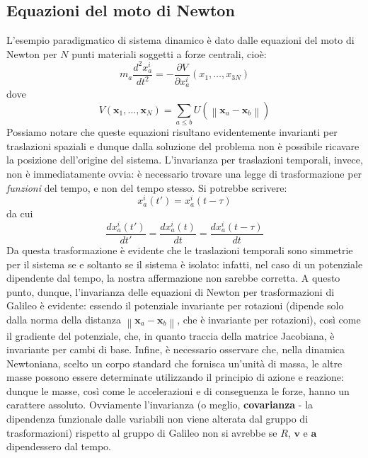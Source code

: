 \documentclass[a4paper,11pt]{book}
\theoremstyle{plain}
\theoremstyle{definition}
\begin{document}
\subsection{Equazioni del moto di Newton}
L'esempio paradigmatico di sistema dinamico è dato dalle equazioni del moto di Newton per $N$ punti materiali soggetti a forze centrali, cioè:
\[
m_a \frac{d^2x_a^i}{dt^2}=-\frac{\partial V}{\partial x_a^i}(x_1,\ldots,x_{3N})
\]
dove 
\[
V(\textbf{x}_1,\ldots,\textbf{x}_N)=\sum_{a\leq b} U(\left\| \textbf{x}_a-\textbf{x}_b \right\|)
\]
Possiamo notare che queste equazioni risultano evidentemente invarianti per traslazioni spaziali e dunque dalla soluzione del problema non è possibile ricavare la posizione dell'origine del sistema. L'invarianza per traslazioni temporali, invece, non è immediatamente ovvia: è necessario trovare una legge di trasformazione per \emph{funzioni} del tempo, e non del tempo stesso. Si potrebbe scrivere:
\[
x_a^i(t')=x_a^i(t-\tau)
\]
da cui
\[
\frac{dx_a^i(t')}{dt'}=\frac{dx_a^i(t)}{dt}=\frac{dx_a^i(t-\tau)}{dt}
\]
Da questa trasformazione è evidente che le traslazioni temporali sono simmetrie per il sistema se e soltanto se il sistema è isolato: infatti, nel caso di un potenziale dipendente dal tempo, la nostra affermazione non sarebbe corretta. A questo punto, dunque, l'invarianza delle equazioni di Newton per trasformazioni di Galileo è evidente: essendo il potenziale invariante per rotazioni (dipende solo dalla norma della distanza $\left\| \textbf{x}_a-\textbf{x}_b \right\|$, che è invariante per rotazioni), così come il gradiente del potenziale, che, in quanto traccia della matrice Jacobiana, è invariante per cambi di base. Infine, è necessario osservare che, nella dinamica Newtoniana, scelto un corpo standard che fornisca un'unità di massa, le altre masse possono essere determinate utilizzando il principio di azione e reazione: dunque le masse, così come le accelerazioni e di conseguenza le forze, hanno un carattere assoluto. Ovviamente l'invarianza (o meglio, \textbf{covarianza} - la dipendenza funzionale dalle variabili non viene alterata dal gruppo di trasformazioni) rispetto al gruppo di Galileo non si avrebbe se $R$, $\textbf{v}$ e $\textbf{a}$ dipendessero dal tempo. 
\end{document}
